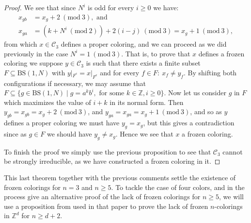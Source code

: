 \documentclass[letterpaper,10pt]{amsart}
\theoremstyle{plain}
\newcommand{\BS}[1][N]{\mathrm{BS}(1,#1)}
\begin{document}
\begin{proof}
	
	
	We see that since $N^i$ is odd for every $i\ge 0$ we have:
	\begin{align*}
	x_{gb}&=x_g+2\ (\mathrm{mod} \ 3), \text{ and} \\
	x_{ga}&=(k+N^i \ (\mathrm{mod} \ 2)) + 2(i-j) \ (\mathrm{mod} \ 3)=x_g+1 \ (\mathrm{mod} \ 3),
	\end{align*}
	from which $x\in \mathcal{C}_3$ defines a proper coloring, and we can proceed as we did previously in the case $N^i=1\ (\mathrm{mod} \ 3)$. That is, to prove that $x$ defines a frozen coloring we suppose $y\in \mathcal{C}_3$ is such that there exists a finite subset $F\subseteq \BS$ with $y|_{F^ c}=x|_{F^c}$ and for every $f\in F: \ x_f\neq y_f$. By shifting both configurations if necessary, we may assume that $F\subseteq \{g\in \BS\mid g=a^kb^i, \text{ for some }k\in \mathbb{Z}, i\ge 0\}$. Now let us consider $g$ in $F$ which maximizes the value of $i+k$ in its normal form. Then $y_{gb}=x_{gb}=x_g+2\ (\mathrm{mod} \ 3)$, and $y_{ga}=x_{ga}=x_g+1\ (\mathrm{mod} \ 3)$, and so as $y$ defines a proper coloring we must have $y_g=x_g$, but this gives a contradiction since as $g\in F$ we should have $y_g\neq x_g$. Hence we see that $x$ a frozen coloring.
	
	To finish the proof we simply use the previous proposition to see that $\mathcal{C}_3$ cannot be strongly irreducible, as we have constructed a frozen coloring in it.
\end{proof}

This last theorem together with the previous comments settle the existence of frozen colorings for $n=3$ and $n\ge 5$. To tackle the case of four colors, and in the process give an alternative proof of the lack of frozen colorings for $n\ge 5$, we will use a proposition from \cite{alon2019mixing} used in that paper to prove the lack of frozen $n$-colorings in $\mathbb{Z}^d$ for $n\ge d+2$.
\end{document}
